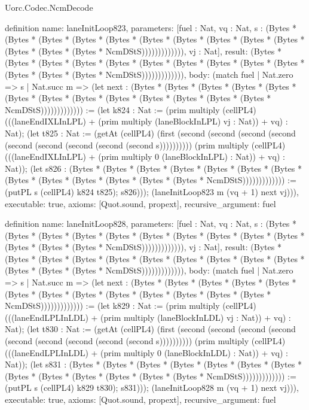 \begin{lexlean}{Uorc.Codec.NcmDecode}
\begin{semanticmodule}
definition{
  name: laneInitLoop823,
  parameters: [fuel : Nat, vq : Nat, s : (Bytes * (Bytes * (Bytes * (Bytes * (Bytes * (Bytes * (Bytes * (Bytes * (Bytes * (Bytes * (Bytes * (Bytes * (Bytes * NcmDStS))))))))))))), vj : Nat],
  result: (Bytes * (Bytes * (Bytes * (Bytes * (Bytes * (Bytes * (Bytes * (Bytes * (Bytes * (Bytes * (Bytes * (Bytes * (Bytes * NcmDStS))))))))))))),
  body: (match fuel
    | Nat.zero => s
    | Nat.succ m => (let next : (Bytes * (Bytes * (Bytes * (Bytes * (Bytes * (Bytes * (Bytes * (Bytes * (Bytes * (Bytes * (Bytes * (Bytes * (Bytes * NcmDStS))))))))))))) := (let k824 : Nat := (prim multiply (cellPL4) (((laneEndIXLInLPL) + (prim multiply (laneBlockInLPL) vj : Nat)) + vq) : Nat); (let t825 : Nat := (getAt (cellPL4) (first (second (second (second (second (second (second (second (second (second s)))))))))) (prim multiply (cellPL4) (((laneEndIXLInLPL) + (prim multiply 0 (laneBlockInLPL) : Nat)) + vq) : Nat)); (let s826 : (Bytes * (Bytes * (Bytes * (Bytes * (Bytes * (Bytes * (Bytes * (Bytes * (Bytes * (Bytes * (Bytes * (Bytes * (Bytes * NcmDStS))))))))))))) := (putPL s (cellPL4) k824 t825); s826))); (laneInitLoop823 m (vq + 1) next vj))),
  executable: true,
  axioms: [Quot.sound, propext],
  recursive_argument: fuel
}

definition{
  name: laneInitLoop828,
  parameters: [fuel : Nat, vq : Nat, s : (Bytes * (Bytes * (Bytes * (Bytes * (Bytes * (Bytes * (Bytes * (Bytes * (Bytes * (Bytes * (Bytes * (Bytes * (Bytes * NcmDStS))))))))))))), vj : Nat],
  result: (Bytes * (Bytes * (Bytes * (Bytes * (Bytes * (Bytes * (Bytes * (Bytes * (Bytes * (Bytes * (Bytes * (Bytes * (Bytes * NcmDStS))))))))))))),
  body: (match fuel
    | Nat.zero => s
    | Nat.succ m => (let next : (Bytes * (Bytes * (Bytes * (Bytes * (Bytes * (Bytes * (Bytes * (Bytes * (Bytes * (Bytes * (Bytes * (Bytes * (Bytes * NcmDStS))))))))))))) := (let k829 : Nat := (prim multiply (cellPL4) (((laneEndLPLInLDL) + (prim multiply (laneBlockInLDL) vj : Nat)) + vq) : Nat); (let t830 : Nat := (getAt (cellPL4) (first (second (second (second (second (second (second (second (second (second s)))))))))) (prim multiply (cellPL4) (((laneEndLPLInLDL) + (prim multiply 0 (laneBlockInLDL) : Nat)) + vq) : Nat)); (let s831 : (Bytes * (Bytes * (Bytes * (Bytes * (Bytes * (Bytes * (Bytes * (Bytes * (Bytes * (Bytes * (Bytes * (Bytes * (Bytes * NcmDStS))))))))))))) := (putPL s (cellPL4) k829 t830); s831))); (laneInitLoop828 m (vq + 1) next vj))),
  executable: true,
  axioms: [Quot.sound, propext],
  recursive_argument: fuel
}


\end{semanticmodule}
\end{lexlean}
